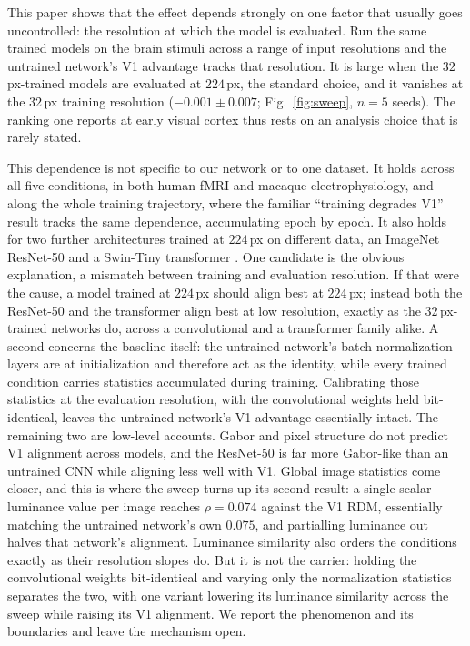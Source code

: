 \documentclass[10pt,twocolumn]{article}
\begin{document}
This paper shows that the effect depends strongly on one factor that usually goes uncontrolled: the resolution at which the model is evaluated. Run the same trained models on the brain stimuli across a range of input resolutions and the untrained network's V1 advantage tracks that resolution. It is large when the $32$\,px-trained models are evaluated at $224$\,px, the standard choice, and it vanishes at the $32$\,px training resolution ($-0.001 \pm 0.007$; Fig.~\ref{fig:sweep}, $n=5$ seeds). The ranking one reports at early visual cortex thus rests on an analysis choice that is rarely stated.

This dependence is not specific to our network or to one dataset. It holds across all five conditions, in both human fMRI and macaque electrophysiology, and along the whole training trajectory, where the familiar ``training degrades V1'' result tracks the same dependence, accumulating epoch by epoch. It also holds for two further architectures trained at $224$\,px on different data, an ImageNet ResNet-50 \citep{he2016} and a Swin-Tiny transformer \citep{liu2021}. One candidate is the obvious explanation, a mismatch between training and evaluation resolution. If that were the cause, a model trained at $224$\,px should align best at $224$\,px; instead both the ResNet-50 and the transformer align best at low resolution, exactly as the $32$\,px-trained networks do, across a convolutional and a transformer family alike. A second concerns the baseline itself: the untrained network's batch-normalization layers are at initialization and therefore act as the identity, while every trained condition carries statistics accumulated during training. Calibrating those statistics at the evaluation resolution, with the convolutional weights held bit-identical, leaves the untrained network's V1 advantage essentially intact. The remaining two are low-level accounts. Gabor and pixel structure do not predict V1 alignment across models, and the ResNet-50 is far more Gabor-like than an untrained CNN while aligning less well with V1. Global image statistics come closer, and this is where the sweep turns up its second result: a single scalar luminance value per image reaches $\rho = 0.074$ against the V1 RDM, essentially matching the untrained network's own $0.075$, and partialling luminance out halves that network's alignment. Luminance similarity also orders the conditions exactly as their resolution slopes do. But it is not the carrier: holding the convolutional weights bit-identical and varying only the normalization statistics separates the two, with one variant lowering its luminance similarity across the sweep while raising its V1 alignment. We report the phenomenon and its boundaries and leave the mechanism open.
\end{document}
